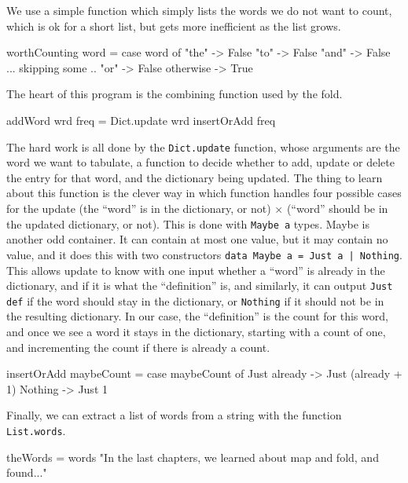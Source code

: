 \documentclass[12pt]{amsbook}
\begin{document}
We use a simple function which simply lists the words we do not want to count,
which is ok for a short list, but gets more inefficient as the list grows.
\begin{code}
worthCounting word = case word of 
                       "the"     -> False
                       "to"      -> False
                       "and"     -> False
                       ... skipping some ..
                       "or"      -> False
                       otherwise -> True
\end{code}
The heart of this program is the combining function used by the fold.
\begin{code}
addWord wrd freq = Dict.update wrd insertOrAdd freq
\end{code}
The hard work is all done by the \texttt{Dict.update} function,
whose arguments are the word we want to tabulate,
a function to decide whether to add, update or delete the entry for that word,
and the dictionary being updated.
The thing to learn about this function is the clever way in which function handles four possible cases for the update
(the ``word'' is in the dictionary, or not) $\times$ (``word'' should be in the updated dictionary, or not).
This is done with \texttt{Maybe a} types.
Maybe is another odd container.
It can contain at most one value, but it may contain no value,
and it does this with two constructors \texttt{data Maybe a = Just a | Nothing}.
This allows update to know with one input whether a ``word'' is already
in the dictionary, and if it is what the ``definition'' is,
and similarly, 
it can output \texttt{Just def} if the word should stay in the dictionary, or \texttt{Nothing} if it should not be in the resulting dictionary.
In our case, the ``definition'' is the count for this word, 
and once we see a word it stays in the dictionary, 
starting with a count of one, and incrementing the count if there is already a count.
\begin{code}
insertOrAdd maybeCount = case maybeCount of
                           Just already -> Just (already + 1)
                           Nothing      -> Just 1
\end{code}
Finally, we can extract a list of words from a string with the function \texttt{List.words}.
\begin{code}
theWords = words "In the last chapters, we learned about map and fold, and found..."
\end{code}
\end{document}
